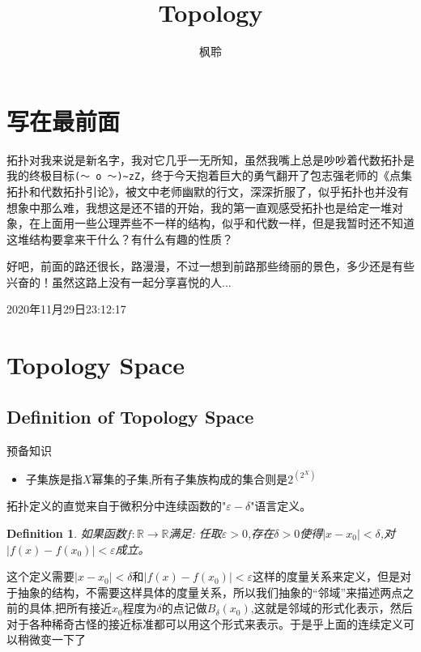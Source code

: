 \documentclass{article}
\newtheorem{definition}[theorem]{Definition}
\newcommand*{\xfunc}[4]{{#2}\colon{#3}{#1}{#4}}
\newcommand*{\func}[3]{\xfunc{\to}{#1}{#2}{#3}}
\begin{document}
\title{Topology}
\author{枫聆}
\maketitle

\tableofcontents
\section{写在最前面}

拓扑对我来说是新名字，我对它几乎一无所知，虽然我嘴上总是吵吵着代数拓扑是我的终极目标\verb|(～ o ～)~zZ|，终于今天抱着巨大的勇气翻开了包志强老师的《点集拓扑和代数拓扑引论》，被文中老师幽默的行文，深深折服了，似乎拓扑也并没有想象中那么难，我想这是还不错的开始，我的第一直观感受拓扑也是给定一堆对象，在上面用一些公理弄些不一样的结构，似乎和代数一样，但是我暂时还不知道这堆结构要拿来干什么？有什么有趣的性质？

好吧，前面的路还很长，路漫漫，不过一想到前路那些绮丽的景色，多少还是有些兴奋的！虽然这路上没有一起分享喜悦的人...

2020年11月29日23:12:17

\section{Topology Space}
\subsection{Definition of Topology Space} 
预备知识

\begin{itemize}
	\item 子集族是指$X$幂集的子集,所有子集族构成的集合则是$2^{(2^X)}$				
\end{itemize}


拓扑定义的直觉来自于微积分中连续函数的"$\varepsilon-\delta$"语言定义。

\begin{definition}
如果函数$\func{f}{\mathbb{R}}{\mathbb{R}}$满足: 任取$\varepsilon > 0$,存在$\delta > 0$使得$|x-x_0| < \delta$,对$|f(x)-f(x_0)| < \varepsilon$成立。
\end{definition}

这个定义需要$|x-x_0| < \delta$和$|f(x)-f(x_0)| < \varepsilon$这样的度量关系来定义，但是对于抽象的结构，不需要这样具体的度量关系，所以我们抽象的“邻域”来描述两点之前的具体,把所有接近$x_0$程度为$\delta$的点记做$B_{\delta}(x_0)$,这就是邻域的形式化表示，然后对于各种稀奇古怪的接近标准都可以用这个形式来表示。于是乎上面的连续定义可以稍微变一下了
\end{document}
